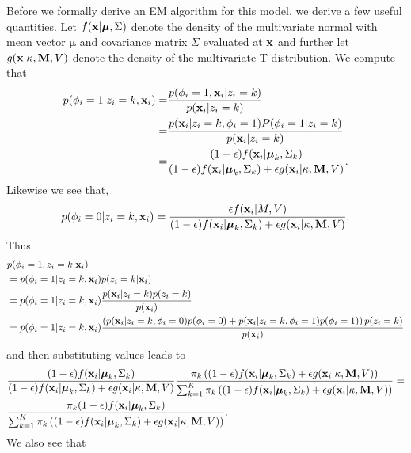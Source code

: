 \documentclass[12pt,english]{article}
\begin{document}
Before we formally derive an EM algorithm for this model, we derive a few useful quantities. Let $f({\bf x} | \boldsymbol{\mu}, \Sigma)$ denote the density of the multivariate normal with mean vector $\boldsymbol{\mu}$ and covariance matrix $\Sigma$ evaluated at ${\bf x}$ and further let $g({\bf x} | \kappa, {\bf M}, V )$ denote the density of the multivariate T-distribution. We compute that
\begin{equation}
\begin{split}
p(\phi_i = 1|z_i = k , {\bf x}_i ) = &\frac{p(\phi_i=1, {\bf x}_i|z_i = k)}{p({\bf x}_i|z_i = k)}\\
=  & \frac{p({\bf x}_i|z_i = k, \phi_i =1)P(\phi_i=1|z_i= k)}{p({\bf x}_i|z_i = k)}\\
=  &\frac{(1-\epsilon)f({\bf x}_i|\boldsymbol{\mu}_k, \Sigma_{k})}{(1-\epsilon) f({\bf x}_i|\boldsymbol{\mu}_k, \Sigma_k) + \epsilon g({\bf x}_i|\kappa, {\bf M}, V)}.
\end{split}
\end{equation}
Likewise we see that,
\begin{equation}
\begin{split}
p(\phi_i = 0|z_i = k , {\bf x}_i ) = \frac{\epsilon f({\bf x}_i|M, V)}{(1-\epsilon) f({\bf x}_i|\boldsymbol{\mu}_k, \Sigma_k) + \epsilon g({\bf x}_i|\kappa, {\bf M}, V)}.
\end{split}
\end{equation}
Thus
\begin{equation}
\begin{split}
& p(\phi_i = 1, z_i = k| {\bf x}_i ) \\
& = p(\phi_i = 1|z_i = k, {\bf x}_i)p(z_i = k|{\bf x}_i)\\
& = p(\phi_i = 1|z_i = k, {\bf x}_i)\frac{p({\bf x}_i|z_i = k)p(z_i = k)}{p({\bf x}_i)}\\
& = p(\phi_i = 1|z_i = k, {\bf x}_i)\frac{\left(p({\bf x}_i|z_i = k,\phi_i =0)p(\phi_i=0) + p({\bf x}_i|z_i = k,\phi_i =1)p(\phi_i=1) \right)p(z_i = k)}{p({\bf x}_i)}\\
\end{split}
\end{equation}
and then substituting values leads to
\begin{equation}
\begin{split}
& \frac{(1-\epsilon)f({\bf x}_i|\boldsymbol{\mu}_k, \Sigma_{k})}{ (1-\epsilon) f({\bf x}_i|\boldsymbol{\mu}_k, \Sigma_k) + \epsilon g({\bf x}_i|\kappa, {\bf M}, V)}\frac{\pi_k \left((1-\epsilon)f({\bf x}_i|\boldsymbol{\mu}_k, \Sigma_{k}) + \epsilon g({\bf x}_i|\kappa, {\bf M}, V)\right)}{\sum_{k=1}^{K}\pi_k\left((1-\epsilon) f({\bf x}_i|\boldsymbol{\mu}_k, \Sigma_k) + \epsilon g({\bf x}_i|\kappa, {\bf M}, V)\right)} = \\
& \frac{\pi_k(1-\epsilon)f({\bf x}_i|\boldsymbol{\mu}_k, \Sigma_{k})}{\sum_{k=1}^{K}\pi_k\left((1-\epsilon) f({\bf x}_i|\boldsymbol{\mu}_k, \Sigma_k) + \epsilon g({\bf x}_i|\kappa, {\bf M}, V)\right)}.\\
\end{split}
\end{equation}
We also see that
\end{document}
